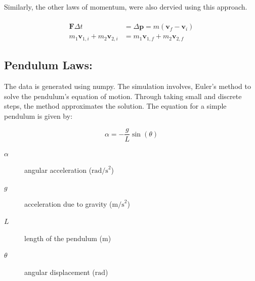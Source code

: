 \documentclass{article}
\begin{document}
\\
\\

Similarly, the other laws of momentum, were also dervied using this approach. \\ 
\\

\begin{align} \label{eq:impulse_momentum}
\mathbf{F} \Delta t &= \Delta \mathbf{p} = m(\mathbf{v}_f - \mathbf{v}_i) \\
m_1 \mathbf{v}_{1,i} + m_2 \mathbf{v}_{2,i} &= m_1 \mathbf{v}_{1,f} + m_2 \mathbf{v}_{2,f}
\end{align} 



\subsection{Pendulum Laws:}

The data is generated using numpy. The simulation involves, Euler's method to solve the pendulum's equation of motion. Through taking small and discrete steps, the method approximates the solution. The equation for a simple pendulum is given by: \\

\begin{center}
\begin{equation}
\alpha = -\frac{g}{L} \sin(\theta)
\end{equation}
\end{center}

\begin{description}
    \item[\(\alpha\)] angular acceleration (\(\text{rad/s}^2\))
    \item[\(g\)] acceleration due to gravity (\(\text{m/s}^2\))
    \item[\(L\)] length of the pendulum (\(\text{m}\))
    \item[\(\theta\)] angular displacement (\(\text{rad}\))
\end{description}
\end{document}
